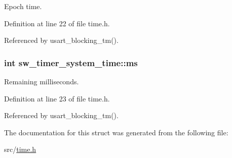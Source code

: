 Epoch time. 



Definition at line 22 of file time.\+h.



Referenced by usart\+\_\+blocking\+\_\+tm().

\hypertarget{structsw__timer__system__time_aafb47623ce45c3d1617e54d2025b679a}{}
\subsubsection[{ms}]{\setlength{\rightskip}{0pt plus 5cm}int sw\+\_\+timer\+\_\+system\+\_\+time\+::ms}\label{structsw__timer__system__time_aafb47623ce45c3d1617e54d2025b679a}


Remaining milliseconds. 



Definition at line 23 of file time.\+h.



Referenced by usart\+\_\+blocking\+\_\+tm().



The documentation for this struct was generated from the following file\+:\begin{DoxyCompactItemize}
\item 
src/\hyperlink{time_8h}{time.\+h}\end{DoxyCompactItemize}
